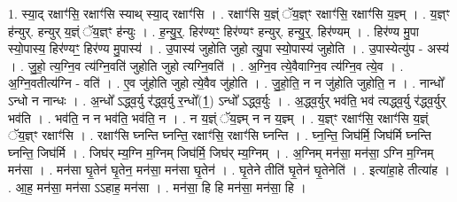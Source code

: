 \documentclass[17pt]{extarticle}
\begin{document}
1. स्या॒द् रक्षाꣳ॑सि॒ रक्षाꣳ॑सि स्याथ् स्या॒द् रक्षाꣳ॑सि । . रक्षाꣳ॑सि य॒ज्ञ्ं ॅय॒ज्ञ्ꣳ रक्षाꣳ॑सि॒ रक्षाꣳ॑सि य॒ज्ञ्म् । . य॒ज्ञ्ꣳ ह॑न्युर्. हन्युर् य॒ज्ञ्ं ॅय॒ज्ञ्ꣳ ह॑न्युः । . ह॒न्यु॒र्॒. हिर॑ण्यꣳ॒॒ हिर॑ण्यꣳ हन्युर्. हन्यु॒र्॒. हिर॑ण्यम् । . हिर॑ण्य मु॒पा स्यो॒पास्य॒ हिर॑ण्यꣳ॒॒ हिर॑ण्य मु॒पास्य॑ । . उ॒पास्य॑ जुहोति जुहो त्यु॒पा स्यो॒पास्य॑ जुहोति । . उ॒पास्येत्यु॑प - अस्य॑ । . जु॒हो॒ त्य॒ग्नि॒व त्य॑ग्नि॒वति॑ जुहोति जुहो त्यग्नि॒वति॑ । . अ॒ग्नि॒व त्ये॒वैवाग्नि॒व त्य॑ग्नि॒व त्ये॒व । . अ॒ग्नि॒वतीत्य॑ग्नि - वति॑ । . ए॒व जु॑होति जुहो त्ये॒वैव जु॑होति । . जु॒हो॒ति॒ न न जु॑होति जुहोति॒ न । . नान्धो᳚ ऽन्धो न नान्धः । . अ॒न्धो᳚ ऽद्ध्व॒र्यु र॑द्ध्व॒र्यु र॒न्धो᳚(1॒) ऽन्धो᳚ ऽद्ध्व॒र्युः । . अ॒द्ध्व॒र्युर् भव॑ति॒ भव॑ त्यद्ध्व॒र्यु र॑द्ध्व॒र्युर् भव॑ति । . भव॑ति॒ न न भव॑ति॒ भव॑ति॒ न । . न य॒ज्ञ्ं ॅय॒ज्ञ्म् न न य॒ज्ञ्म् । . य॒ज्ञ्ꣳ रक्षाꣳ॑सि॒ रक्षाꣳ॑सि य॒ज्ञ्ं ॅय॒ज्ञ्ꣳ रक्षाꣳ॑सि । . रक्षाꣳ॑सि घ्नन्ति घ्नन्ति॒ रक्षाꣳ॑सि॒ रक्षाꣳ॑सि घ्नन्ति । . घ्न॒न्ति॒ जिघ॑र्मि॒ जिघ॑र्मि घ्नन्ति घ्नन्ति॒ जिघ॑र्मि । . जिघ॑र् म्य॒ग्नि म॒ग्निम् जिघ॑र्मि॒ जिघ॑र् म्य॒ग्निम् । . अ॒ग्निम् मन॑सा॒ मन॑सा॒ ऽग्नि म॒ग्निम् मन॑सा । . मन॑सा घृ॒तेन॑ घृ॒तेन॒ मन॑सा॒ मन॑सा घृ॒तेन॑ । . घृ॒तेने तीति॑ घृ॒तेन॑ घृ॒तेनेति॑ । . इत्या॑हा॒हे तीत्या॑ह । . आ॒ह॒ मन॑सा॒ मन॑सा ऽऽहाह॒ मन॑सा । . मन॑सा॒ हि हि मन॑सा॒ मन॑सा॒ हि । \newline
\end{document}
